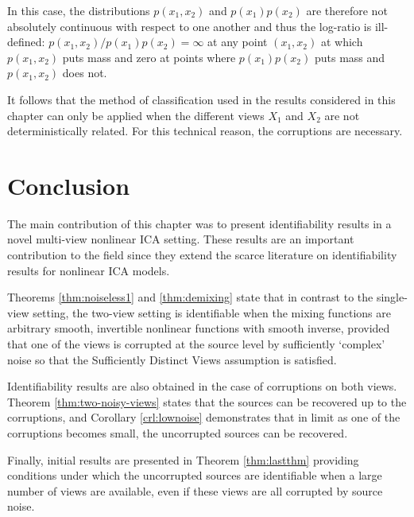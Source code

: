 In this case, the distributions $p(x_1, x_2)$ and $p(x_1)p(x_2)$ are therefore not absolutely continuous with respect to one another and thus the log-ratio is ill-defined: $p(x_1, x_2)/p(x_1)p(x_2) = \infty$ at any point $(x_1,x_2)$ at which $p(x_1, x_2)$ puts mass and zero at points where $p(x_1)p(x_2)$ puts mass and $p(x_1,x_2)$ does not.

It follows that the method of classification used in the results considered in this chapter can only be applied when the different views $X_1$ and $X_2$ are not deterministically related.
For this technical reason, the corruptions are necessary.



\section{Conclusion}
\label{sec:on_suffistv}

The main contribution of this chapter was to present identifiability results in a novel multi-view nonlinear ICA setting.
These results are an important contribution to the field since they extend the scarce literature on identifiability results for nonlinear ICA models.


Theorems \ref{thm:noiseless1} and \ref{thm:demixing} state that in contrast to the single-view setting, the two-view setting is identifiable when the mixing functions are arbitrary smooth, invertible nonlinear functions with smooth inverse, provided that one of the views is corrupted at the source level by sufficiently `complex' noise so that the Sufficiently Distinct Views assumption is satisfied. 

Identifiability results are also obtained in the case of corruptions on both views. Theorem \ref{thm:two-noisy-views} states that the sources can be recovered up to the corruptions, and Corollary \ref{crl:lownoise} demonstrates that in limit as one of the corruptions becomes small, the uncorrupted sources can be recovered.

Finally, initial results are presented in Theorem \ref{thm:lastthm} providing conditions under which the uncorrupted sources are identifiable when a large number of views are available, even if these views are all corrupted by source noise.




